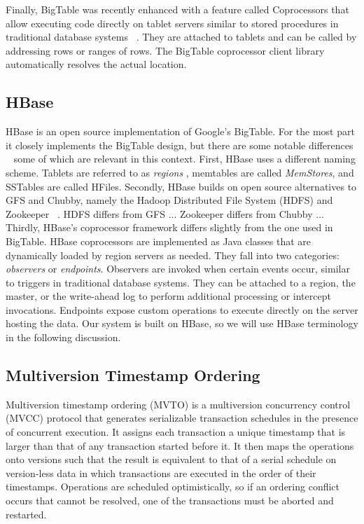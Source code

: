 \documentclass[10pt,final,journal]{IEEEtran}
\begin{document}
Finally, BigTable was recently enhanced with a feature called Coprocessors that allow executing code directly on tablet servers similar to stored procedures in traditional database systems ~\cite{Dean:2009}. They are attached to tablets and can be called by addressing rows or ranges of rows. The BigTable coprocessor client library automatically resolves the actual location.

\subsection{HBase}
HBase is an open source implementation of Google's BigTable. For the most part it closely implements the BigTable design, but there are some notable differences ~\cite{George:2011} some of which are relevant in this context. First, HBase uses a different naming scheme. Tablets are referred to as \emph{regions }, memtables are called \emph{MemStores}, and SSTables are called HFiles. Secondly, HBase builds on open source alternatives to GFS and Chubby, namely the Hadoop Distributed File System (HDFS) and Zookeeper ~\cite{Hunt:2010:ZWC:1855840.1855851}. HDFS differs from GFS ... Zookeeper differs from Chubby ...
Thirdly, HBase's coprocessor framework differs slightly from the one used in BigTable. HBase coprocessors are implemented as Java classes that are dynamically loaded by region servers as needed. They fall into two categories: \emph{observers} or \emph{endpoints}. Observers are invoked when certain events occur, similar to triggers in traditional database systems. They can be attached to a region, the master, or the write-ahead log to perform additional processing or intercept invocations. Endpoints expose custom operations to execute directly on the server hosting the data.
Our system is built on HBase, so we will use HBase terminology in the following discussion.

\subsection{Multiversion Timestamp Ordering}
Multiversion timestamp ordering (MVTO) is a multiversion concurrency control (MVCC) protocol that generates serializable transaction schedules in the presence of concurrent execution. It assigns each transaction a unique timestamp that is larger than that of any transaction started before it. It then maps the operations onto versions such that the result is equivalent to that of a serial schedule on version-less data in which transactions are executed in the order of their timestamps. Operations are scheduled optimistically, so if an ordering conflict occurs that cannot be resolved, one of the transactions must be aborted and restarted.
\end{document}
